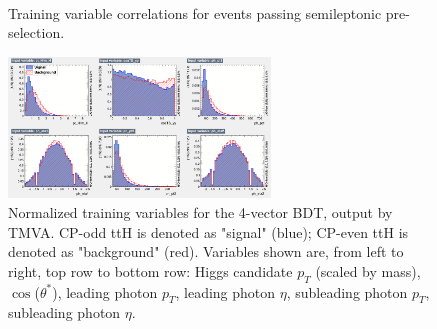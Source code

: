 \begin{figure}[htbp]
  \centering
  	\\
 \caption{Training variable correlations for events passing semileptonic pre-selection.}
 \label{fig:semilepcorr4vec}
  
\end{figure}
\begin{figure}[htbp]
  \centering
  	\includegraphics[width=0.62\textwidth]{figures/TMVABDTStudies/semilep-vbls4vec/semilep4vecvbls1.png}
    \caption{Normalized training variables for the 4-vector BDT, output by TMVA. CP-odd ttH is denoted as "signal" (blue); CP-even ttH is denoted as "background" (red). Variables shown are, from left to right, top row to bottom row: Higgs candidate $p_{T}$ (scaled by mass), $\cos$($\theta^{*}$), leading photon $p_{T}$, leading photon $\eta$, subleading photon $p_{T}$, subleading photon $\eta$.}
  \label{fig:semilep4vecvbls1}
\end{figure}

